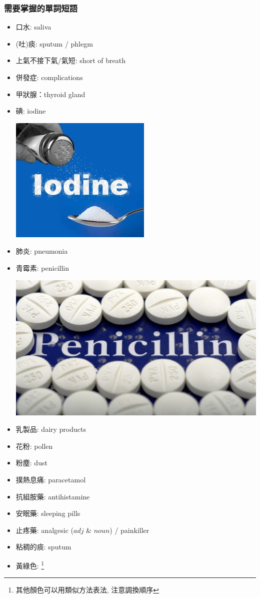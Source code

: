 \subsubsection*{需要掌握的單詞短語}
\begin{multicols}{2}
\begin{itemize}
  \itemsep0em
  \item 口水: saliva
  \item (吐)痰:  sputum / phlegm
  \item 上氣不接下氣/氣短: short of breath
  \item 併發症: complications
  \item 甲狀腺：thyroid gland
  \item 碘: iodine
  \begin{center}
    \includegraphics[scale=.7]{pics/iodine}
  \end{center}
  \item 肺炎: pneumonia
  \item 青霉素: penicillin
  \begin{center}
    \includegraphics[scale=.2]{pics/penicillin}
  \end{center}
  \item 乳製品: dairy products
  \item 花粉: pollen
  \item 粉塵: dust
  \item 撲熱息痛: paracetamol
  \item 抗組胺藥: antihistamine
  \item 安眠藥: sleeping pills
  \item 止疼藥: analgesic ($adj$ \& $noun$) / painkiller
  \item 粘稠的痰:  sputum
  \item 黃綠色: \footnote{其他顏色可以用類似方法表法, 注意調換順序}
\end{itemize}
\end{multicols}


